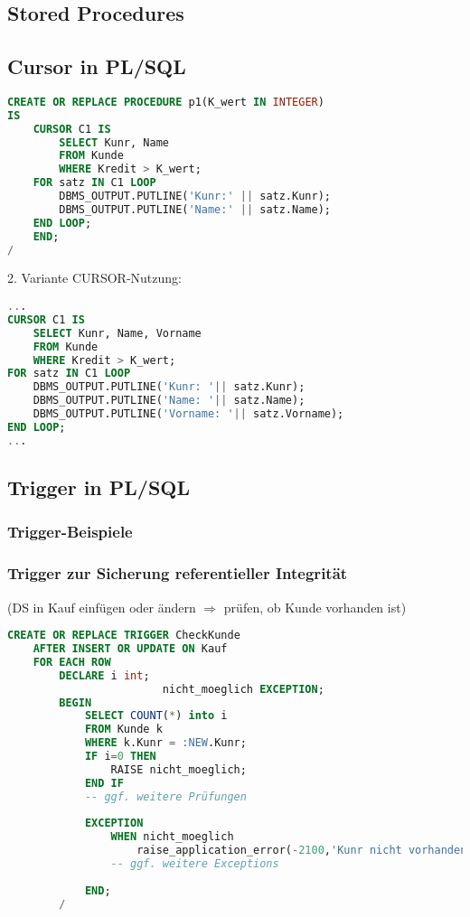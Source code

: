 \subsection{Stored Procedures}
\subsection{Cursor in PL/SQL}
\begin{lstlisting}[language=SQL]
CREATE OR REPLACE PROCEDURE p1(K_wert IN INTEGER)
IS
    CURSOR C1 IS
        SELECT Kunr, Name
        FROM Kunde
        WHERE Kredit > K_wert;
    FOR satz IN C1 LOOP
        DBMS_OUTPUT.PUTLINE('Kunr:' || satz.Kunr);
        DBMS_OUTPUT.PUTLINE('Name:' || satz.Name);
    END LOOP;
    END;
/
\end{lstlisting}

2. Variante CURSOR-Nutzung:
\begin{lstlisting}[language=SQL]
...
CURSOR C1 IS 
	SELECT Kunr, Name, Vorname
	FROM Kunde
	WHERE Kredit > K_wert;
FOR satz IN C1 LOOP
	DBMS_OUTPUT.PUTLINE('Kunr: '|| satz.Kunr);
	DBMS_OUTPUT.PUTLINE('Name: '|| satz.Name);
	DBMS_OUTPUT.PUTLINE('Vorname: '|| satz.Vorname);
END LOOP;
...
\end{lstlisting}
\subsection{Trigger in PL/SQL}
\subsubsection{Trigger-Beispiele}
\subsubsection*{Trigger zur Sicherung referentieller Integrität}
(DS in Kauf einfügen oder ändern $\Rightarrow$ prüfen, ob Kunde vorhanden ist)
\begin{lstlisting}[language=SQL]
CREATE OR REPLACE TRIGGER CheckKunde
	AFTER INSERT OR UPDATE ON Kauf
	FOR EACH ROW
		DECLARE i int;
						nicht_moeglich EXCEPTION;
		BEGIN 
			SELECT COUNT(*) into i
			FROM Kunde k
			WHERE k.Kunr = :NEW.Kunr;
			IF i=0 THEN
				RAISE nicht_moeglich;
			END IF
			-- ggf. weitere Prüfungen
			
			EXCEPTION
				WHEN nicht_moeglich
					raise_application_error(-2100,'Kunr nicht vorhanden');
				-- ggf. weitere Exceptions
			
			END;
		/
\end{lstlisting}

